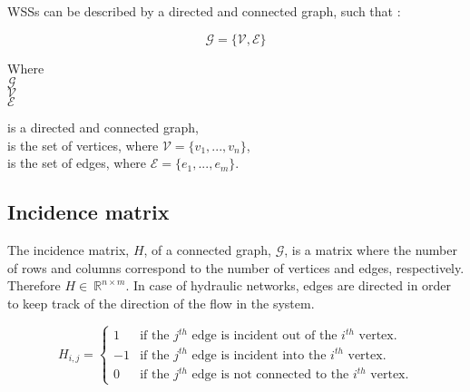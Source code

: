WSSs can be described by a directed and connected graph, such that \cite{graph_intro}: 

\begin{equation}
  \label{Numberofchords}
  \mathcal{G} = \{\mathcal{V}, \mathcal{E} \} 
\end{equation}

\begin{minipage}[t]{0.20\textwidth}
Where\\
\hspace*{8mm} $\mathcal{G} $ \\
\hspace*{8mm} $\mathcal{V} $ \\
\hspace*{8mm} $\mathcal{E} $
\end{minipage}
\begin{minipage}[t]{0.68\textwidth}
\vspace*{2mm}
\hspace*{8mm} is a directed and connected graph,\\
\hspace*{8mm} is the set of vertices, where $\mathcal{V} = \{v_1, ..., v_n\}$,\\
\hspace*{8mm} is the set of edges, where $\mathcal{E} = \{e_1, ..., e_m\}$. 
\end{minipage}

\subsection{Incidence matrix}
\label{incidence_matrix}

The incidence matrix, $H$, of a connected graph, $\mathcal{G}$, is a matrix where the number of rows and columns correspond to the number of vertices and edges, respectively. Therefore $H\in \: \mathbb{R}^{n \times m}$. In case of hydraulic networks, edges are directed in order to keep track of the direction of the flow in the system. 

\begin{equation}
\label{DiGraph}
 H_{i,j} =
		\left\{
		\begin{array}{ll}
		
		1 			&      \text{if the $j^{th}$ edge is incident out of the $i^{th}$ vertex}.	
\\
	    -1          &      \text{if the $j^{th}$ edge is incident into the $i^{th}$ vertex}.
\\
        0           &      \text{if the $j^{th}$ edge is not connected to the $i^{th}$ vertex}.

		\end{array}
		\right.
\end{equation}	

